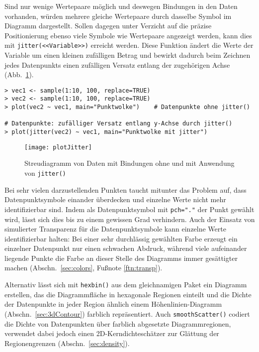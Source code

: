 \label{sec:plotManyValsA}
Sind nur wenige Wertepaare möglich und deswegen Bindungen in den Daten vorhanden, würden mehrere gleiche Wertepaare durch dasselbe Symbol im Diagramm dargestellt. Sollen dagegen unter Verzicht auf die präzise Positionierung ebenso viele Symbole wie Wertepaare angezeigt werden, kann dies mit \lstinline!jitter(<<Variable>>)! erreicht werden. Diese Funktion ändert die Werte der Variable um einen kleinen zufälligen Betrag und bewirkt dadurch beim Zeichnen jedes Datenpunkts einen zufälligen Versatz entlang der zugehörigen Achse (Abb.\ \ref{fig:plotJitter}).
\begin{lstlisting}
> vec1 <- sample(1:10, 100, replace=TRUE)
> vec2 <- sample(1:10, 100, replace=TRUE)
> plot(vec2 ~ vec1, main="Punktwolke")    # Datenpunkte ohne jitter()

# Datenpunkte: zufälliger Versatz entlang y-Achse durch jitter()
> plot(jitter(vec2) ~ vec1, main="Punktwolke mit jitter")
\end{lstlisting}

\begin{figure}[ht]
\centering
\texttt{[image: plotJitter]}
\vspace*{-1em}
\caption{Streudiagramm von Daten mit Bindungen ohne und mit Anwendung von \lstinline!jitter()!}
\label{fig:plotJitter}
\end{figure}

Bei sehr vielen darzustellenden Punkten taucht mitunter das Problem auf, dass Datenpunktsymbole einander überdecken und einzelne Werte nicht mehr identifizierbar sind. Indem als Datenpunktsymbol mit \lstinline!pch="."! der Punkt gewählt wird, lässt sich dies bis zu einem gewissen Grad verhindern. Auch der Einsatz von simulierter Transparenz für die Datenpunktsymbole kann einzelne Werte identifizierbar halten: Bei einer sehr durchlässig gewählten Farbe erzeugt ein einzelner Datenpunkt nur einen schwachen Abdruck, während viele aufeinander liegende Punkte die Farbe an dieser Stelle des Diagramms immer gesättigter machen (Abschn.\ \ref{sec:colors}, Fußnote \ref{ftn:transp}).

Alternativ lässt sich mit \lstinline!hexbin()! aus dem gleichnamigen Paket \cite{Carr2009} ein Diagramm erstellen, das die Diagrammfläche in hexagonale Regionen einteilt und die Dichte der Datenpunkte in jeder Region ähnlich einem Höhenlinien-Diagramm (Abschn.\ \ref{sec:3dContour}) farblich repräsentiert. Auch \lstinline!smoothScatter()! codiert die Dichte von Datenpunkten über farblich abgesetzte Diagrammregionen, verwendet dabei jedoch einen 2D-Kerndichteschätzer zur Glättung der Regionengrenzen (Abschn.\ \ref{sec:density}).

